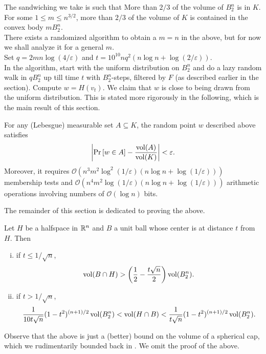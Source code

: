 The sandwiching we take is such that More than $2/3$ of the volume of $B_2^n$ is in $K$. For some $1\leq m\leq n^{3/2}$, more than $2/3$ of the volume of $K$ is contained in the convex body $mB_2^n$.\\
There exists a randomized algorithm to obtain a $m=n$ in the above, but for now we shall analyze it for a general $m$.\\

Set $q=2mn\log(4/\varepsilon)$ and $t=10^{10}nq^2(n\log n + \log(2/\varepsilon))$.\\
In the algorithm, start with the uniform distribution on $B_2^n$ and do a lazy random walk in $qB_2^n$ up till time $t$ with $B_2^n$-steps, filtered by $F$ (as described earlier in the section). Compute $w=H(v_t)$. We claim that $w$ is close to being drawn from the uniform distribution. This is stated more rigorously in the following, which is the main result of this section.

\begin{ftheo}
	\label{LovS algorithm works!}
	For any (Lebesgue) measurable set $A\subseteq K$, the random point $w$ described above satisfies
	\[ \left| \Pr\left[w\in A\right] - \frac{\operatorname{vol}(A)}{\operatorname{vol}(K)} \right| < \varepsilon. \]
	Moreover, it requires $\mathcal{O}(n^3m^2\log^2(1/\varepsilon)(n\log n + \log(1/\varepsilon)))$ membership tests and $\mathcal{O}(n^4 m^2 \log(1/\varepsilon) (n\log n + \log(1/\varepsilon)))$ arithmetic operations involving numbers of $\mathcal{O}(\log n)$ bits.
\end{ftheo}

The remainder of this section is dedicated to proving the above.

\begin{lemma}
	\label{better bound on spherical caps}
	Let $H$ be a halfspace in $\mathbb{R}^n$ and $B$ a unit ball whose center is at distance $t$ from $H$. Then
	\begin{enumerate}[(i)]
		\item if $t\leq 1/\sqrt{n}$,
		\[ \operatorname{vol}(B\cap H) > \left(\frac{1}{2} - \frac{t\sqrt{n}}{2}\right)\operatorname{vol}(B_2^n). \]
		\item if $t>1/\sqrt{n}$,
		\[ \frac{1}{10t\sqrt{n}}(1-t^2)^{(n+1)/2}\operatorname{vol}(B_2^n) < \operatorname{vol}(H\cap B) < \frac{1}{t\sqrt{n}}(1-t^2)^{(n+1)/2}\operatorname{vol}(B_2^n). \]
	\end{enumerate}
\end{lemma}

Observe that the above is just a (better) bound on the volume of a spherical cap, which we rudimentarily bounded back in . We omit the proof of the above.\\

